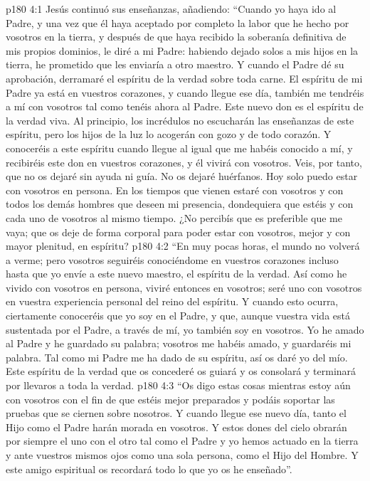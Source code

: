 \vs p180 4:1 Jesús continuó sus enseñanzas, añadiendo: “Cuando yo haya ido al Padre, y una vez que él haya aceptado por completo la labor que he hecho por vosotros en la tierra, y después de que haya recibido la soberanía definitiva de mis propios dominios, le diré a mi Padre: habiendo dejado solos a mis hijos en la tierra, he prometido que les enviaría a otro maestro. Y cuando el Padre dé su aprobación, derramaré el espíritu de la verdad sobre toda carne. El espíritu de mi Padre ya está en vuestros corazones, y cuando llegue ese día, también me tendréis a mí con vosotros tal como tenéis ahora al Padre. Este nuevo don es el espíritu de la verdad viva. Al principio, los incrédulos no escucharán las enseñanzas de este espíritu, pero los hijos de la luz lo acogerán con gozo y de todo corazón. Y conoceréis a este espíritu cuando llegue al igual que me habéis conocido a mí, y recibiréis este don en vuestros corazones, y él vivirá con vosotros. Veis, por tanto, que no os dejaré sin ayuda ni guía. No os dejaré huérfanos. Hoy solo puedo estar con vosotros en persona. En los tiempos que vienen estaré con vosotros y con todos los demás hombres que deseen mi presencia, dondequiera que estéis y con cada uno de vosotros al mismo tiempo. ¿No percibís que es preferible que me vaya; que os deje de forma corporal para poder estar con vosotros, mejor y con mayor plenitud, en espíritu?
\vs p180 4:2 “En muy pocas horas, el mundo no volverá a verme; pero vosotros seguiréis conociéndome en vuestros corazones incluso hasta que yo envíe a este nuevo maestro, el espíritu de la verdad. Así como he vivido con vosotros en persona, viviré entonces en vosotros; seré uno con vosotros en vuestra experiencia personal del reino del espíritu. Y cuando esto ocurra, ciertamente conoceréis que yo soy en el Padre, y que, aunque vuestra vida está sustentada por el Padre, a través de mí, yo también soy en vosotros. Yo he amado al Padre y he guardado su palabra; vosotros me habéis amado, y guardaréis mi palabra. Tal como mi Padre me ha dado de su espíritu, así os daré yo del mío. Este espíritu de la verdad que os concederé os guiará y os consolará y terminará por llevaros a toda la verdad.
\vs p180 4:3 “Os digo estas cosas mientras estoy aún con vosotros con el fin de que estéis mejor preparados y podáis soportar las pruebas que se ciernen sobre nosotros. Y cuando llegue ese nuevo día, tanto el Hijo como el Padre harán morada en vosotros. Y estos dones del cielo obrarán por siempre el uno con el otro tal como el Padre y yo hemos actuado en la tierra y ante vuestros mismos ojos como una sola persona, como el Hijo del Hombre. Y este amigo espiritual os recordará todo lo que yo os he enseñado”.
